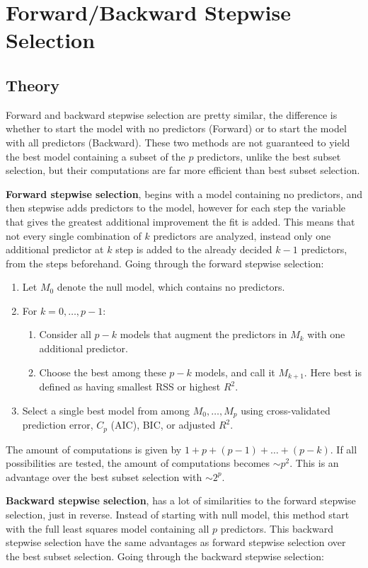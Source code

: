 \section{Forward/Backward Stepwise Selection}
\subsection{Theory}
Forward and backward stepwise selection are pretty similar, the difference is whether to start the model with no predictors (Forward) or to start the model with all predictors (Backward). These two methods are not guaranteed to yield the best model containing a subset of the $p$ predictors, unlike the best subset selection, but their computations are far more efficient than best subset selection.

\textbf{Forward stepwise selection}, begins with a model containing no predictors, and then stepwise adds predictors to the model, however for each step the variable that gives the greatest additional improvement the fit is added. This means that not every single combination of $k$ predictors are analyzed, instead only one additional predictor at $k$ step is added to the already decided $k-1$ predictors, from the steps beforehand. Going through the forward stepwise selection:
\begin{enumerate}
	\item Let $M_0$ denote the null model, which contains no predictors.
	\item For $k=0,\dots,p-1$:
	\begin{enumerate}
		\item Consider all $p-k$ models that augment the predictors in $M_k$ with one additional predictor.
		\item Choose the best among these $p-k$ models, and call it $M_{k+1}$. Here best is defined as having smallest RSS or highest $R^2$.
	\end{enumerate}
	\item Select a single best model from among $M_0,\dots,M_p$ using cross-validated prediction error, $C_p$ (AIC), BIC, or adjusted $R^2$. 
\end{enumerate}

The amount of computations is given by $1+p+(p-1)+\dots+(p-k)$. If all possibilities are tested, the amount of computations becomes $\sim p^2$. This is an advantage over the best subset selection with $\sim 2^p$.

\textbf{Backward stepwise selection}, has a lot of similarities to the forward stepwise selection, just in reverse. Instead of starting with null model, this method start with the full least squares model containing all $p$ predictors. This backward stepwise selection have the same advantages as forward stepwise selection over the best subset selection. Going through the backward stepwise selection:

